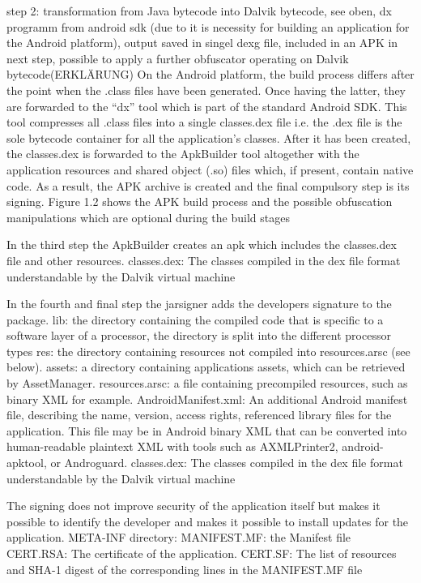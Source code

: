 step 2: transformation from Java bytecode into Dalvik bytecode, see oben, dx programm from android sdk (due to it is necessity for building an application for the Android platform), output saved in singel \gls{dexg} file, included in an APK in next step, possible to apply a further obfuscator operating
on Dalvik bytecode(ERKLÄRUNG)\newline
On the Android platform, the build process differs after the point when the .class files have been generated. Once having the latter, they are forwarded to the “dx” tool which is part of the standard Android SDK. This tool compresses all .class files into a single classes.dex file i.e. the .dex file is the sole bytecode container for all the application’s classes. After it has been created, the classes.dex is forwarded to the ApkBuilder tool altogether with the application resources and shared object (.so) files which, if present, contain native code. As a result, the APK archive is created and the final compulsory step is its signing. Figure 1.2 shows the APK build process and the
possible obfuscation manipulations which are optional during the build stages\newline

In the third step the ApkBuilder creates an \gls{apk} which includes the classes.dex file and other resources.
classes.dex: The classes compiled in the dex file format understandable by the Dalvik virtual machine

In the fourth and final step the jarsigner adds the developers signature to the package.
lib: the directory containing the compiled code that is specific to a software layer of a processor, the directory is split into the different processor types
res: the directory containing resources not compiled into resources.arsc (see below).
assets: a directory containing applications assets, which can be retrieved by AssetManager.
resources.arsc: a file containing precompiled resources, such as binary XML for example.
AndroidManifest.xml: An additional Android manifest file, describing the name, version, access rights, referenced library files for the application. This file may be in Android binary XML that can be converted into human-readable plaintext XML with tools such as AXMLPrinter2, android-apktool, or Androguard.
classes.dex: The classes compiled in the dex file format understandable by the Dalvik virtual machine


The signing does not improve security of the application itself but makes it possible to identify the developer and makes it possible to install updates for the application.
META-INF directory:
    MANIFEST.MF: the Manifest file
    CERT.RSA: The certificate of the application.
    CERT.SF: The list of resources and SHA-1 digest of the corresponding lines in the MANIFEST.MF file



